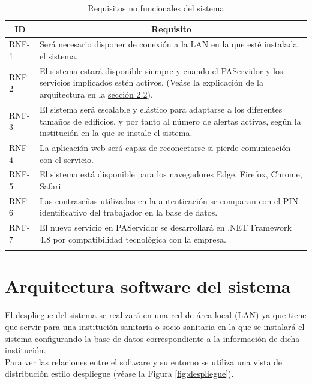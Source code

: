 \begin{longtable}{|p{}|p{}|}
	\hline
	\multicolumn{1}{|c|}{\centering \textbf{ID}} & \multicolumn{1}{c|}{\centering \textbf{Requisito}} \\
	\hline
	RNF-1 	& 	Será necesario disponer de conexión a la LAN en la que esté instalada el sistema. \\
	\hline
	RNF-2	&	El sistema estará disponible siempre y cuando el PAServidor y los servicios implicados estén activos. (Veáse la explicación de la arquitectura en la \hyperref[section-arquitectura]{sección 2.2}).	\\
	\hline
	RNF-3	&	El sistema será escalable y elástico para adaptarse a los diferentes tamaños de edificios, y por tanto al número de alertas activas, según la institución en la que se instale el sistema.\\
	\hline
	RNF-4	&	La aplicación web será capaz de reconectarse si pierde comunicación con el servicio.\\
	\hline
	RNF-5	&	El sistema está disponible para los navegadores Edge, Firefox, Chrome, Safari.\\
	\hline
	RNF-6	&	Las contraseñas utilizadas en la autenticación se comparan con el PIN identificativo del trabajador en la base de datos. \\
	\hline
	RNF-7	&	El nuevo servicio en PAServidor se desarrollará en .NET Framework 4.8 por compatibilidad tecnológica con la empresa. \\
	\hline
\caption{Requisitos no funcionales del sistema}
\label{tab:RNF}
\end{longtable}


\section{Arquitectura software del sistema}
\label{section-arquitectura}

El despliegue del sistema se realizará en una red de área local (LAN) ya que tiene que servir para una institución sanitaria o socio-sanitaria en la que se instalará el sistema configurando la base de datos correspondiente a la información de dicha institución.\\

Para ver las relaciones entre el software y su entorno se utiliza una vista de distribución estilo despliegue (véase la Figura \ref{fig:despliegue}). \\

